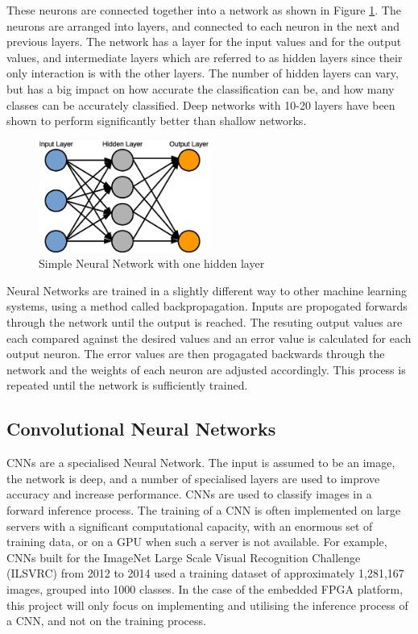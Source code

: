 \documentclass[12pt]{article}
\begin{document}
These neurons are connected together into a network as shown in Figure \ref{fig:ANN}. The neurons are arranged into layers, and connected to each neuron in the next and previous layers. The network has a layer for the input values and for the output values, and intermediate layers which are referred to as hidden layers since their only interaction is with the other layers. The number of hidden layers can vary, but has a big impact on how accurate the classification can be, and how many classes can be accurately classified. Deep networks with 10-20 layers have been shown to perform significantly better than shallow networks\cite{DeepNetworks}.

\begin{figure}[H]
\centering
\includegraphics[width=0.5\textwidth]{figures/ANN.eps}
\caption{Simple Neural Network with one hidden layer}
\label{fig:ANN}
\end{figure}

Neural Networks are trained in a slightly different way to other machine learning systems, using a method called backpropagation. Inputs are propogated forwards through the network until the output is reached. The resuting output values are each compared against the desired values and an error value is calculated for each output neuron. The error values are then progagated backwards through the network and the weights of each neuron are adjusted accordingly. This process is repeated until the network is sufficiently trained.

\subsection{Convolutional Neural Networks}
\label{sec:Background-CNN}

CNNs are a specialised Neural Network. The input is assumed to be an image, the network is deep, and a number of specialised layers are used to improve accuracy and increase performance. CNNs are used to classify images in a forward inference process. The training of a CNN is often implemented on large servers with a significant computational capacity, with an enormous set of training data, or on a GPU when such a server is not available. For example, CNNs built for the ImageNet Large Scale Visual Recognition Challenge (ILSVRC) from 2012 to 2014 used a training dataset of approximately 1,281,167  images, grouped into 1000 classes\cite{ILSVRC}. In the case of the embedded FPGA platform, this project will only focus on implementing and utilising the inference process of a CNN, and not on the training process.
\end{document}
